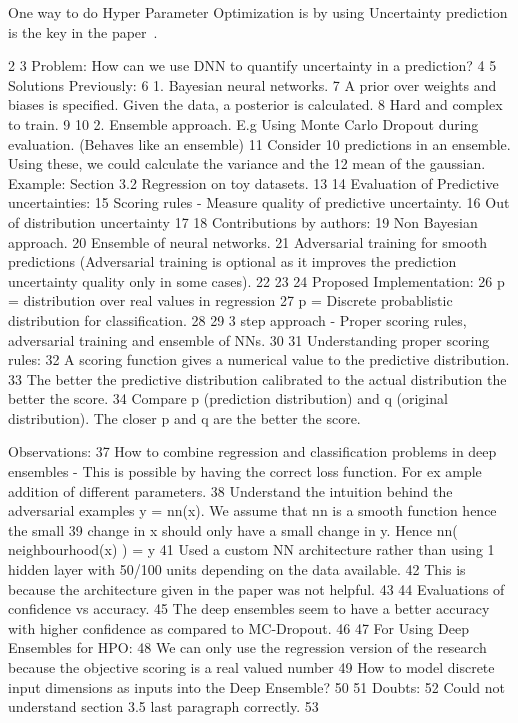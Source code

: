 \documentclass[11pt]{report}
\begin{document}
One way to do Hyper Parameter Optimization is by using 
Uncertainty prediction is the key in the paper~\cite{DeepEnsemblePaper}.

  2 
  3 Problem: How can we use DNN to quantify uncertainty in a prediction?
  4 
  5 Solutions Previously:
  6     1. Bayesian neural networks.
  7        A prior over weights and biases is specified. Given the data, a posterior is calculated.
  8        Hard and complex to train.
  9 
 10     2. Ensemble approach. E.g Using Monte Carlo Dropout during evaluation. (Behaves like an ensemble)
 11        Consider 10 predictions in an ensemble. Using these, we could calculate the variance and the
 12        mean of the gaussian. Example: Section 3.2 Regression on toy datasets.
 13 
 14 Evaluation of Predictive uncertainties:
 15     Scoring rules - Measure quality of predictive uncertainty.
 16     Out of distribution uncertainty
 17 
 18 Contributions by authors:
 19     Non Bayesian approach.
 20     Ensemble of neural networks.
 21     Adversarial training for smooth predictions (Adversarial training is optional as it improves the prediction uncertainty quality only     in some cases).
 22 
 23 
 24 Proposed Implementation:
 26     p = distribution over real values in regression
 27     p = Discrete probablistic distribution for classification.
 28 
 29     3 step approach - Proper scoring rules, adversarial training and ensemble of NNs.
 30 
 31 Understanding proper scoring rules:
 32     A scoring function gives a numerical value to the predictive distribution.
 33     The better the predictive distribution calibrated to the actual distribution the better the score.
 34     Compare p (prediction distribution) and q (original distribution). The closer p and q are the better the score.
 
 Observations:
 37    How to combine regression and classification problems in deep ensembles - This is possible by having the correct loss function. For ex    ample addition of different parameters.
 38    Understand the intuition behind the adversarial examples y = nn(x). We assume that nn is a smooth function hence the small
 39    change in x should only have a small change in y. Hence nn( neighbourhood(x) ) = y
 41    Used a custom NN architecture rather than using 1 hidden layer with 50/100 units depending on the data available.
 42    This is because the architecture given in the paper was not helpful.
 43 
 44 Evaluations of confidence vs accuracy.
 45     The deep ensembles seem to have a better accuracy with higher confidence as compared to MC-Dropout.
 46 
 47 For Using Deep Ensembles for HPO:
 48     We can only use the regression version of the research because the objective scoring is a real valued number
 49     How to model discrete input dimensions as inputs into the Deep Ensemble?
 50 
 51 Doubts:
 52     Could not understand section 3.5 last paragraph correctly.
 53 
\end{document}
